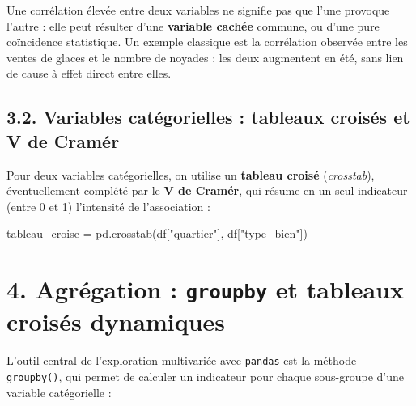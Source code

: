 \documentclass[
  french,
  letterpaper,
  open=any]{scrbook}
\newenvironment{Shaded}{\begin{snugshade}}{\end{snugshade}}
\newcommand{\NormalTok}[1]{\textcolor[rgb]{0.00,0.23,0.31}{#1}}
\newcommand{\OperatorTok}[1]{\textcolor[rgb]{0.37,0.37,0.37}{#1}}
\newcommand{\StringTok}[1]{\textcolor[rgb]{0.13,0.47,0.30}{#1}}
\theoremstyle{definition}
\theoremstyle{definition}
\theoremstyle{remark}
\begin{document}
\begin{tcolorbox}[enhanced jigsaw, arc=.35mm, bottomrule=.15mm, bottomtitle=1mm, breakable, colback=white, colbacktitle=quarto-callout-warning-color!10!white, colframe=quarto-callout-warning-color-frame, coltitle=black, left=2mm, leftrule=.75mm, opacityback=0, opacitybacktitle=0.6, rightrule=.15mm, title=\textcolor{quarto-callout-warning-color}{\faExclamationTriangle}\hspace{0.5em}{Corrélation n'est pas causalité}, titlerule=0mm, toprule=.15mm, toptitle=1mm]

Une corrélation élevée entre deux variables ne signifie pas que l'une
provoque l'autre : elle peut résulter d'une \textbf{variable cachée}
commune, ou d'une pure coïncidence statistique. Un exemple classique est
la corrélation observée entre les ventes de glaces et le nombre de
noyades : les deux augmentent en été, sans lien de cause à effet direct
entre elles.

\end{tcolorbox}

\subsection{3.2. Variables catégorielles : tableaux croisés et V de
Cramér}\label{variables-catuxe9gorielles-tableaux-croisuxe9s-et-v-de-cramuxe9r}

Pour deux variables catégorielles, on utilise un \textbf{tableau croisé}
(\emph{crosstab}), éventuellement complété par le \textbf{V de Cramér},
qui résume en un seul indicateur (entre 0 et 1) l'intensité de
l'association :

\begin{Shaded}
\begin{Highlighting}[]
\NormalTok{tableau\_croise }\OperatorTok{=}\NormalTok{ pd.crosstab(df[}\StringTok{"quartier"}\NormalTok{], df[}\StringTok{"type\_bien"}\NormalTok{])}
\end{Highlighting}
\end{Shaded}

\section{\texorpdfstring{4. Agrégation : \texttt{groupby} et tableaux
croisés
dynamiques}{4. Agrégation : groupby et tableaux croisés dynamiques}}\label{agruxe9gation-groupby-et-tableaux-croisuxe9s-dynamiques}

L'outil central de l'exploration multivariée avec \texttt{pandas} est la
méthode \texttt{groupby()}, qui permet de calculer un indicateur pour
chaque sous-groupe d'une variable catégorielle :
\end{document}
